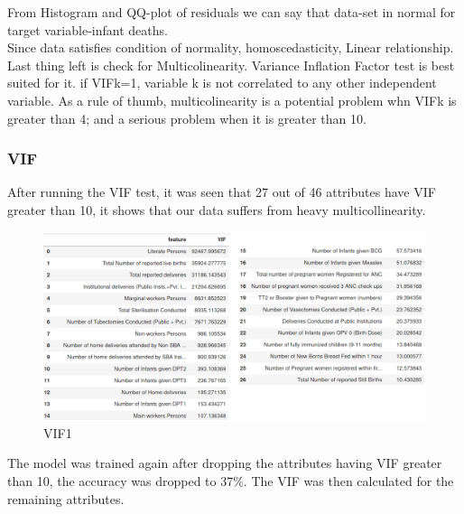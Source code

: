 \documentclass[12pt]{article}
\begin{document}
From Histogram and QQ-plot of residuals we can say that data-set in normal for target variable-infant deaths.\\

Since data satisfies condition of normality, homoscedasticity, Linear relationship. Last thing left is check for Multicolinearity. Variance Inflation Factor test is best suited for it. if VIFk=1, variable k is not correlated to any other independent variable. As a rule of thumb, multicolinearity is a potential problem whn VIFk is greater than 4; and a serious problem when it is greater than 10.\\

\subsubsection{VIF}
After running the VIF test, it was seen that 27 out of 46 attributes have VIF greater than 10, it shows that our data suffers from heavy multicollinearity.\\

\begin{figure}[h]
\hspace{-2.5cm}
\includegraphics[scale=.45]{images/vif1.png}
\caption{VIF1}
\end{figure}

The model was trained again after dropping the attributes having VIF greater than 10, the accuracy was dropped to 37\%. The VIF was then calculated for the remaining attributes.\\
\end{document}
